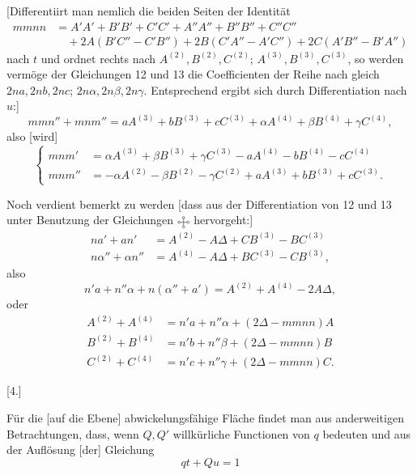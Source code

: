 %
[Differentiirt man nemlich die beiden Seiten der Identität
\[
\begin{aligned}
mmnn&=A'A'+B'B'+C'C'+A''A''+B''B''+C''C''\\
&\quad+2A(B'C''-C'B'')+2B(C'A''-A'C'')+2C(A'B''-B'A'')
\end{aligned}
\]
nach $t$ und ordnet rechts nach $A^{(2)},B^{(2)},C^{(2)}$; $A^{(3)},B^{(3)},C^{(3)}$, so werden vermöge der Gleichungen 12 und 13 die Coefficienten der Reihe nach gleich $2na,2nb,2nc$; $2n\alpha,2n\beta,2n\gamma$. Entsprechend ergibt sich durch Differentiation nach $u$:]
\[
mmn''+mnm''=aA^{(3)}+bB^{(3)}+cC^{(3)}+\alpha A^{(4)}+\beta B^{(4)}+\gamma C^{(4)},
\]
also [wird]
\begin{equation}\tag*{$(\odot)$}
\left\{\begin{aligned}
mnm'&=\alpha A^{(3)}+\beta B^{(3)}+\gamma C^{(3)}-aA^{(4)}-bB^{(4)}-cC^{(4)}\\
mnm''&=-\alpha A^{(2)}-\beta B^{(2)}-\gamma C^{(2)}+aA^{(3)}+bB^{(3)}+cC^{(3)}.
\end{aligned}\right.
\end{equation}
\par\indent Noch verdient bemerkt zu werden [dass aus der Differentiation von 12 und 13 unter Benutzung der Gleichungen $\FourRingCross$ hervorgeht:]
\[
\begin{aligned}
na'+an'&=A^{(2)}-A\Delta+CB^{(3)}-BC^{(3)}\\
n\alpha''+\alpha n''&=A^{(4)}-A\Delta+BC^{(3)}-CB^{(3)},
\end{aligned}
\]
also
\[
n'a+n''\alpha+n(\alpha''+a')=A^{(2)}+A^{(4)}-2A\Delta,
\]
oder
\[
\begin{aligned}
A^{(2)}+A^{(4)}&=n'a+n''\alpha+(2\Delta-mmnn)A\\
B^{(2)}+B^{(4)}&=n'b+n''\beta+(2\Delta-mmnn)B\\
C^{(2)}+C^{(4)}&=n'c+n''\gamma+(2\Delta-mmnn)C.
\end{aligned}
\]
\begin{center}[4.]\end{center}
\noindent\hspace*{1.2em} Für die [auf die Ebene] abwickelungsfähige Fläche findet man aus anderweitigen Betrachtungen, dass, wenn $Q,Q'$ willkürliche Functionen von $q$ bedeuten und aus der Auflösung [der] Gleichung
\[
qt+Qu=1
\]
